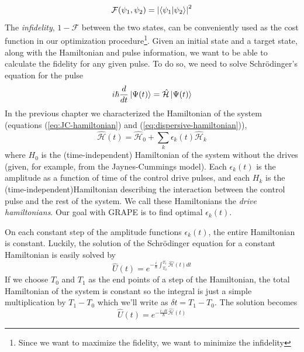 \begin{equation} \label{def:fid}
\mathcal{F} (\psi_1, \psi_2) = \abs{\braket{\psi_1}{\psi_2}}^2
\end{equation}
The \textit{infidelity}, $1 - \mathcal{F}$ between the two states, can be conveniently used as the cost function in our optimization procedure\footnote{Since we want to maximize the fidelity, we want to minimize the infidelity}. Given an initial state and a target state, along with the Hamiltonian and pulse information, we want to be able to calculate the fidelity for any given pulse. To do so, we need to solve Schr\"{o}dinger's equation for the pulse
\begin{equation}
i\hslash\frac{d}{dt}\ket{\Psi (t)} = \hat{\mathcal{H}}\ket{\Psi (t)}
\end{equation}
In the previous chapter we characterized the Hamiltonian of the system (equations (\ref{eq:JC-hamiltonian}) and (\ref{eq:dispersive-hamiltonian})),
\begin{equation} \label{eq:hamiltonianl_form}
\hat{\mathcal{H}} (t) = \hat{\mathcal{H}}_0 + \sum_k{\epsilon_k (t) \hat{\mathcal{H}}_k} %
\end{equation}
where $H_0$ is the (time-independent) Hamiltonian of the system without the drives (given, for example, from the Jaynes-Cummings model). Each $\epsilon_k (t)$ is the amplitude as a function of time of the control drive pulses, and each $H_k$ is the (time-independent)Hamiltonian describing the interaction between the control pulse and the rest of the system. We call these Hamiltonians the \textit{drive hamiltonians}. Our goal with GRAPE is to find optimal $\epsilon_k (t)$.

On each constant step of the amplitude functions $\epsilon_k (t)$, the entire Hamiltonian is constant. Luckily, the solution of the Schr\"{o}dinger equation for a constant Hamiltonian is easily solved by
\begin{equation}
\hat{U} (t) = e^{-\frac{i}{\hslash}\int_{T_0}^{T_1}\hat{\mathcal{H}} (t)dt}
\end{equation}
If we choose $T_0$ and $T_1$ as the end points of a step of the Hamiltonian, the total Hamiltonian of the system is constant so the integral is just a simple multiplication by $T_1-T_0$ which we'll write as $\delta t = T_1 - T_0$. The solution becomes
\begin{equation}
\hat{U} (t) = e^{-\frac{i\cdot \delta t}{\hslash}\hat{\mathcal{H}} (t)}
\end{equation}

